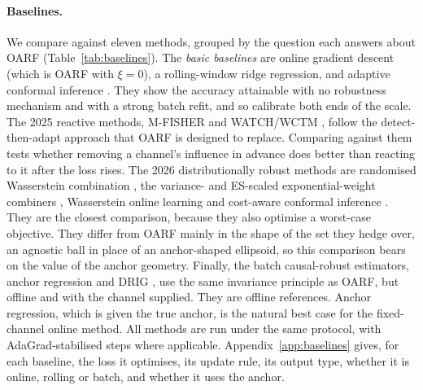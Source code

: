 \documentclass[12pt]{article}
\theoremstyle{plain}
\theoremstyle{remark}
\newcommand{\OARF}{\textsc{OARF}}
\begin{document}
\paragraph{Baselines.}
We compare against eleven methods, grouped by the question each answers about \OARF{}
(Table~\ref{tab:baselines}). The \emph{basic baselines} are online gradient descent
(which is \OARF{} with $\xi=0$), a rolling-window ridge regression, and adaptive
conformal inference \citep{gibbs2021aci}. They show the accuracy attainable with no
robustness mechanism and with a strong batch refit, and so calibrate both ends of the
scale. The 2025 reactive methods, M-FISHER \citep{mfisher2025} and WATCH/WCTM
\citep{watch2025}, follow the detect-then-adapt approach that \OARF{} is designed to
replace. Comparing against them tests whether removing a channel's influence in
advance does better than reacting to it after the loss rises. The 2026
distributionally robust methods are randomised Wasserstein combination
\citep{wang2026online}, the variance- and ES-scaled exponential-weight combiners
\citep{liu2026fcdro}, Wasserstein online learning \citep{chen2026wdro} and cost-aware
conformal inference \citep{costaci2026}. They are the closest comparison, because they
also optimise a worst-case objective. They differ from \OARF{} mainly in the shape of the set they hedge over, an agnostic ball in place of an anchor-shaped ellipsoid, so this comparison bears on the value of the anchor geometry. Finally, the batch
causal-robust estimators, anchor regression \citep{rothenhausler2021anchor} and DRIG
\citep{shen2023drig}, use the same invariance principle as \OARF{}, but offline and
with the channel supplied. They are offline references. Anchor regression, which is given the true anchor, is the natural best case for the fixed-channel online method. All methods are run under the same protocol, with
AdaGrad-stabilised steps where applicable. Appendix~\ref{app:baselines} gives, for
each baseline, the loss it optimises, its update rule, its output type, whether it is
online, rolling or batch, and whether it uses the anchor.
\end{document}
